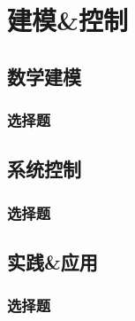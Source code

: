 \documentclass[a4paper,zihao=5,openany,oneside,sub4section]{ctexbook}
\begin{document}
\part{建模\&控制}
	\chapter{数学建模}
		\section{选择题}
	\chapter{系统控制}
		\section{选择题}
	\chapter{实践\&应用}
		\section{选择题}

\backmatter
\printindex %


\end{document}

